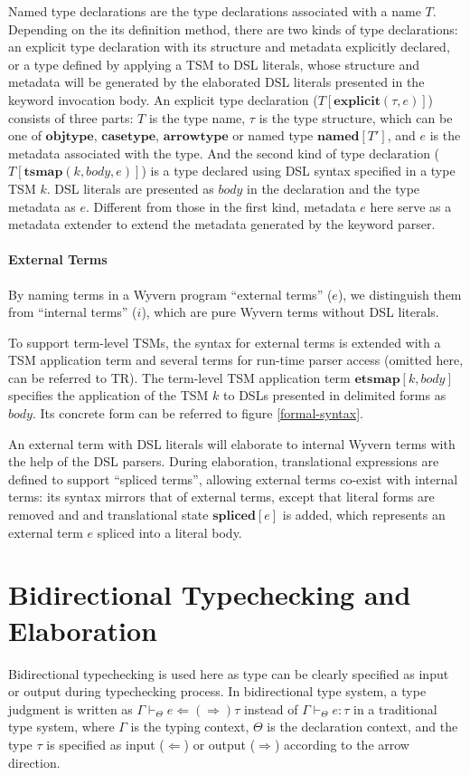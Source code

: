 \documentclass{sig-alternate}
\begin{document}
Named type declarations are the type declarations associated with a name $T$. Depending on the its definition method, there are two kinds of type declarations: an explicit type declaration with its structure and metadata explicitly declared, or a type defined by applying a TSM to DSL literals, whose structure and metadata will be generated by the elaborated DSL literals presented in the keyword invocation body. An explicit type declaration ($T[\mathbf{explicit}(\tau,e)]$) consists of three parts: $T$ is the type name, $\tau$ is the type structure, which can be one of $\mathbf{objtype}$, $\mathbf{casetype}$, $\mathbf{arrowtype}$ or named type $\mathbf{named}[T']$,  and $e$ is the metadata associated with the type. And the second kind of type declaration ($T[\mathbf{tsmap}(k,body,e)]$) is a type declared using DSL syntax specified in a type TSM $k$. DSL literals are presented as $body$ in the declaration and the type metadata as $e$. Different from those in the first kind, metadata $e$ here serve as a metadata extender to extend the metadata generated by the keyword parser.

\paragraph{External Terms}
By naming terms in a Wyvern program ``external terms'' ($e$), we distinguish them from ``internal terms'' ($i$), which are pure Wyvern terms without DSL literals. 

To support term-level TSMs, the syntax for external terms is extended with a TSM application term and several terms for run-time parser access (omitted here, can be referred to TR). The term-level TSM application term $\mathbf{etsmap}[k,body]$ specifies the application of the TSM $k$ to DSLs presented in delimited forms as $body$. Its concrete form can be referred to figure \ref{formal-syntax}.

An external term with DSL literals will elaborate to internal Wyvern terms with the help of the DSL parsers. During elaboration, translational expressions  
are defined to support ``spliced terms'', allowing external terms co-exist with internal terms: its syntax mirrors that of external terms, except that literal forms are removed and and translational state $\mathbf{spliced}[e]$ is added, which represents an external term $e$ spliced into a literal body.

\section{Bidirectional Typechecking and Elaboration}
Bidirectional typechecking is used here as type can be clearly specified as input or output during typechecking process. In bidirectional type system, a type judgment is written as $\Gamma\vdash_{\Theta} e\Leftarrow(\Rightarrow)\tau$ instead of $\Gamma\vdash_{\Theta} e:\tau$ in a traditional type system, where $\Gamma$ is the typing context, $\Theta$ is the declaration context, and the type $\tau$ is specified as input ($\Leftarrow$) or output ($\Rightarrow$) according to the arrow direction. 
\end{document}
